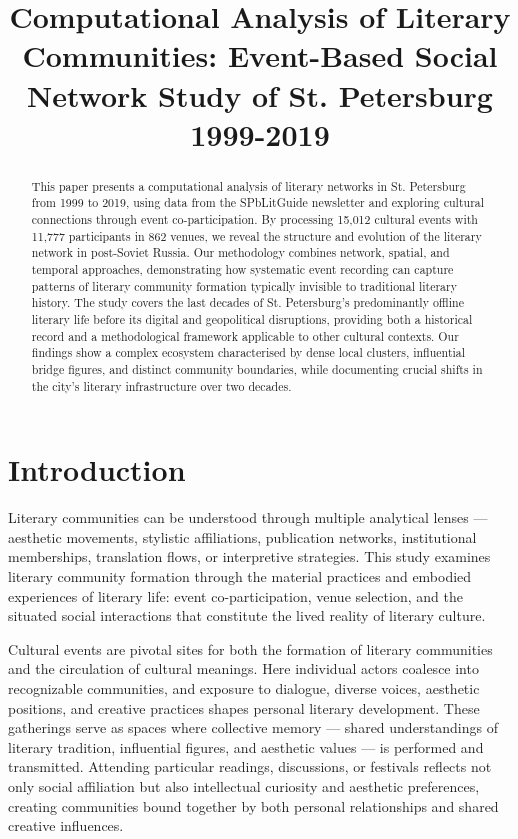 \documentclass{jcls}
\title{Computational Analysis of Literary Communities: Event-Based Social Network Study of St. Petersburg 1999-2019}
\begin{document}
\maketitle



\begin{abstract}
	This paper presents a computational analysis of literary networks in St. Petersburg from 1999 to 2019, using data from the SPbLitGuide newsletter and exploring cultural connections through event co-participation. By processing 15,012 cultural events with 11,777 participants in 862 venues, we reveal the structure and evolution of the literary network in post-Soviet Russia. Our methodology combines network, spatial, and temporal approaches, demonstrating how systematic event recording can capture patterns of literary community formation typically invisible to traditional literary history. The study covers the last decades of St. Petersburg's predominantly offline literary life before its digital and geopolitical disruptions, providing both a historical record and a methodological framework applicable to other cultural contexts. Our findings show a complex ecosystem characterised by dense local clusters, influential bridge figures, and distinct community boundaries, while documenting crucial shifts in the city's literary infrastructure over two decades.
\end{abstract}


\section{Introduction}
Literary communities can be understood through multiple analytical lenses — aesthetic movements, stylistic affiliations, publication networks, institutional memberships, translation flows, or interpretive strategies. This study examines literary community formation through the material practices and embodied experiences of literary life: event co-participation, venue selection, and the situated social interactions that constitute the lived reality of literary culture. 

Cultural events are pivotal sites for both the formation of literary communities and the circulation of cultural meanings. Here individual actors coalesce into recognizable communities, and exposure to dialogue, diverse voices, aesthetic positions, and creative practices shapes personal literary development. These gatherings serve as spaces where collective memory — shared understandings of literary tradition, influential figures, and aesthetic values — is performed and transmitted. Attending particular readings, discussions, or festivals reflects not only social affiliation but also intellectual curiosity and aesthetic preferences, creating communities bound together by both personal relationships and shared creative influences.
\end{document}

